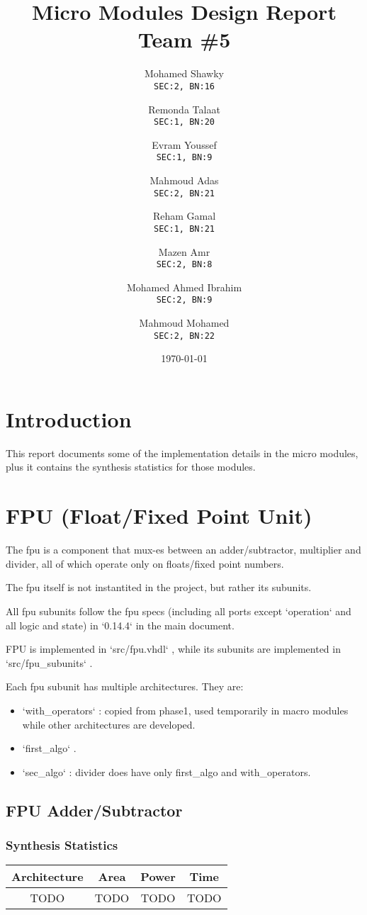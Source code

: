 \documentclass[12pt]{report}
\title{\textbf{Micro Modules Design Report}\\Team \#5}
\author{
  Mohamed Shawky\\
  \small\texttt{SEC:2, BN:16}
  \and
  Remonda Talaat\\
  \small\texttt{SEC:1, BN:20}
  \and
  Evram Youssef\\
  \small\texttt{SEC:1, BN:9}
  \and
  Mahmoud Adas\\
  \small\texttt{SEC:2, BN:21}
  \and
  Reham Gamal\\
  \small\texttt{SEC:1, BN:21}
  \and
  Mazen Amr\\
  \small\texttt{SEC:2, BN:8}
  \and
  Mohamed Ahmed Ibrahim\\
  \small\texttt{SEC:2, BN:9}
  \and
  Mahmoud Mohamed\\
  \small\texttt{SEC:2, BN:22}
}
\date{\today}
\begin{document}
    \thispagestyle{empty}

    \maketitle
    \tableofcontents
    \clearpage


    \section{Introduction}
    This report documents some of the implementation details in the micro modules, plus it contains the synthesis statistics for those modules. 

    \section{FPU (Float/Fixed Point Unit)}
    The fpu is a component that mux-es between an adder/subtractor, multiplier and divider, all of which operate only on floats/fixed point numbers. 

    The fpu itself is not instantited in the project, but rather its subunits. 

    All fpu subunits follow the fpu specs (including all ports except `operation` and all logic and state) in `0.14.4` in the main document. 

    FPU is implemented in `src/fpu.vhdl` , while its subunits are implemented in `src/fpu\_subunits` . 

    Each fpu subunit has multiple architectures. 
    They are: 
    \begin{itemize}
      \item `with\_operators` : copied from phase1, used temporarily in macro modules while other architectures are developed. 
    \item `first\_algo` . 
    \item `sec\_algo` : divider does have only first\_algo and with\_operators. 
    \end{itemize}

    \subsection{FPU Adder/Subtractor}
    \subsubsection{Synthesis Statistics}
    \begin{tabular}{||c|c|c|c||}
      \hline
      Architecture & Area & Power & Time\\\hline\hline
      TODO & TODO & TODO & TODO\\\hline
  \end{tabular}
\end{document}
